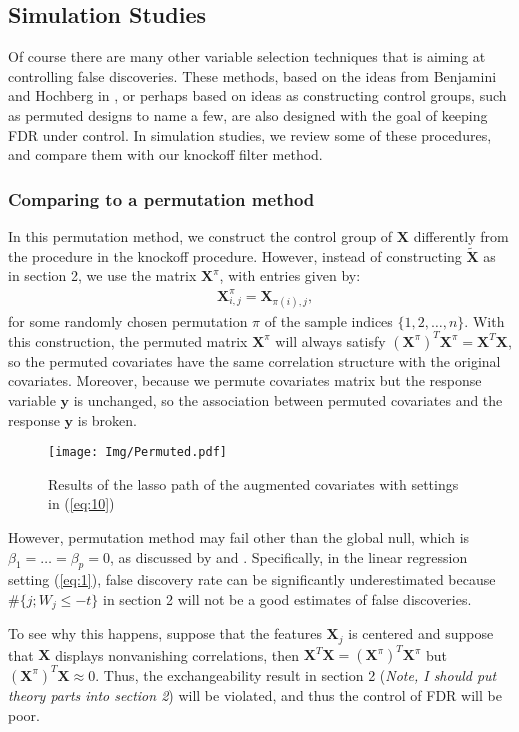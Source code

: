 \documentclass{uwstat572}
\begin{document}
\subsection{Simulation Studies}
Of course there are many other variable selection techniques that is aiming at controlling false discoveries. These methods, based on the ideas from Benjamini and Hochberg in \cite{benjamini1995controlling}, or perhaps based on ideas as constructing control groups, such as permuted designs to name a few, are also designed with the goal of keeping FDR under control. In simulation studies, we review some of these procedures, and compare them with our knockoff filter method.

\subsubsection{Comparing to a permutation method}
In this permutation method, we construct the control group of $\bm{X}$ differently from the procedure in the knockoff procedure. However, instead of constructing $\tilde{\bm{X}}$ as in section 2, we use the matrix $\bm{X}^\pi$, with entries given by:
\begin{align*}
& \bm{X}_{i,j}^\pi = \bm{X}_{\pi(i),j},
\end{align*}
for some randomly chosen permutation $\pi$ of the sample indices $\{1,2,\dots, n\}$. With this construction, the permuted matrix $\bm{X}^\pi$ will always satisfy $(\bm{X}^\pi)^T\bm{X}^\pi = \bm{X}^T\bm{X}$, so the permuted covariates have the same correlation structure with the original covariates. Moreover, 
because we permute covariates matrix but the response variable $\bm{y}$ is unchanged, so the association between permuted covariates and the response $\bm{y}$ is broken. 

\begin{figure}\label{Fig:1}
	\centering\texttt{[image: Img/Permuted.pdf]}
	\caption{Results of the lasso path of the augmented covariates with settings in (\ref{eq:10}) }
\end{figure}

However, permutation method may fail other than the global null, which is $\beta_1=\dots=\beta_p=0$, as discussed by \cite{chung2013exact} and \cite{chung2013multivariate}. Specifically, in the linear regression setting (\ref{eq:1}), false discovery rate can be significantly underestimated because $\#\{j; W_j\leq -t\}$ in section 2 will not be a good estimates of false discoveries. 

To see why this happens, suppose that the features $\bm{X}_j$ is centered and suppose that $\bm{X}$ displays nonvanishing correlations, then $\bm{X}^T\bm{X} = (\bm{X}^\pi)^T\bm{X}^\pi$ but $(\bm{X}^\pi)^T\bm{X} \approx 0$. Thus, the exchangeability result in section 2 ({\it Note, I should put theory parts into section 2}) will be violated, and thus the control of FDR will be poor.
\end{document}
